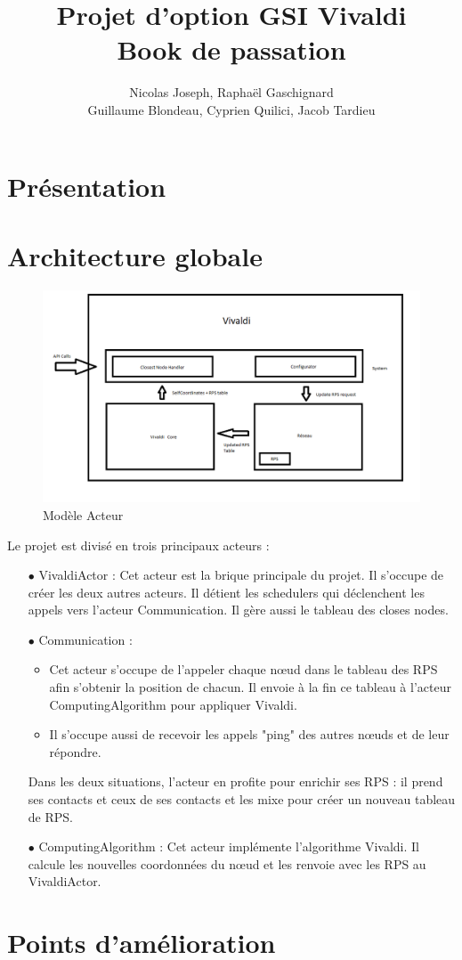 \documentclass[11pt,a4paper]{article}
\title{Projet d'option GSI Vivaldi \\ Book de passation}
\author{Nicolas Joseph, Raphaël Gaschignard\\ Guillaume Blondeau, Cyprien Quilici, Jacob Tardieu}
\begin{document}
\maketitle

\section{Présentation}



\section{Architecture globale}

\begin{figure}[h]
   \includegraphics[scale=0.4]{VivaldiArchitecture}
   \caption{\label{acteur} Modèle Acteur}
\end{figure}

Le projet est divisé en trois principaux acteurs : 
\begin{itemize}
	\item[$\bullet$] VivaldiActor : Cet acteur est la brique principale du projet. Il s'occupe de créer les deux autres acteurs. Il détient les schedulers qui déclenchent les appels vers l'acteur Communication. Il gère aussi le tableau des closes nodes.
	\item[$\bullet$] Communication : 
		\begin{itemize}
			\item Cet acteur s'occupe de l'appeler chaque n\oe ud dans le tableau des RPS afin s'obtenir la position de chacun. Il envoie à la fin ce tableau à l'acteur ComputingAlgorithm pour appliquer Vivaldi.
			\item Il s'occupe aussi de recevoir les appels "ping" des autres n\oe uds et de leur répondre.
		\end{itemize}
		Dans les deux situations, l'acteur en profite pour enrichir ses RPS : il prend ses contacts et ceux de ses contacts et les mixe pour créer un nouveau tableau de RPS.
	\item[$\bullet$] ComputingAlgorithm : Cet acteur implémente l'algorithme Vivaldi. Il calcule les nouvelles coordonnées du n\oe ud et les renvoie avec les RPS au VivaldiActor.
\end{itemize}

\section{Points d'amélioration}
\end{document}
